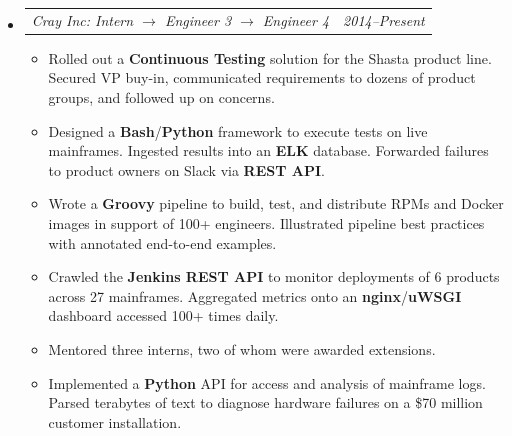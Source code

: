 \documentclass[12pt,letterpaper]{article}
\makeatletter
\newcommand{\headerpair}[2]{
    \begin{tabular*}{\linewidth}{l@{ \extracolsep{\fill} }r} {\large\emph{#1}} & {\large\emph{#2}}
    \end{tabular*}
}
\newcommand{\headerrow}[3]{\headerpair{#2: #1}{#3}}
\makeatother
\begin{document}
\begin{itemize}[leftmargin=\parindent]
    \item[]
        \headerrow
            {Intern $\to$ Engineer 3 $\to$ Engineer 4}
            {Cray Inc}
            {2014--Present}
        \begin{itemize}[leftmargin=\parindent]

            \item Rolled out a \textbf{Continuous Testing} solution for the Shasta product line. Secured VP buy-in, communicated requirements to dozens of product groups, and followed up on concerns.

            \item Designed a \textbf{Bash}/\textbf{Python} framework to execute tests on live mainframes. Ingested results into an \textbf{ELK} database. Forwarded failures to product owners on Slack via \textbf{REST API}.

            \item Wrote a \textbf{Groovy} pipeline to build, test, and distribute RPMs and Docker images in support of 100+ engineers. Illustrated pipeline best practices with annotated end-to-end examples.

            \item Crawled the \textbf{Jenkins REST API} to monitor deployments of 6 products across 27 mainframes. Aggregated metrics onto an \textbf{nginx}/\textbf{uWSGI} dashboard accessed 100+ times daily.

            \item Mentored three interns, two of whom were awarded extensions.

            \item Implemented a \textbf{Python} API for access and analysis of mainframe logs. Parsed terabytes of text to diagnose hardware failures on a \$70 million customer installation.







\end{itemize}
\end{itemize}
\end{document}
